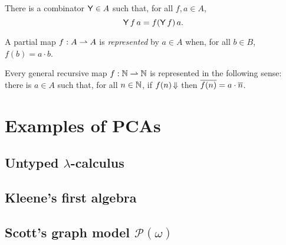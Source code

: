 \begin{definition}
  \label{def:combinator-fix}
  There is a combinator $\mathsf{Y} \in A$ such that, for all $f, a \in A$,
  \begin{equation*}
    \mathsf{Y} \, f \, a = f (\mathsf{Y} \, f) \, a.
  \end{equation*}
\end{definition}

\begin{definition}
  \label{def:representable-function}
  A partial map $f : A \rightharpoonup A$ is \emph{represented} by $a \in A$ when,
  for all $b \in B$, $f(b) = a \cdot b$.
\end{definition}

\begin{theorem}
  Every general recursive map $f : \mathbb{N} \rightharpoonup \mathbb{N}$ is represented in the following sense:
  there is $a \in A$ such that, for all $n \in \mathbb{N}$, if $f(n)\,{\Downarrow}$ then $\overline{f(n)} = a \cdot \overline{n}$.
\end{theorem}

\section{Examples of PCAs}

\subsection{Untyped $\lambda$-calculus}
\label{sec:untyped-lambda-calculus}

\subsection{Kleene's first algebra}
\label{sec:kleenes-first-algebra}

\subsection{Scott's graph model $\mathcal{P}(\omega)$}
\label{sec:scotts-graph-model}




